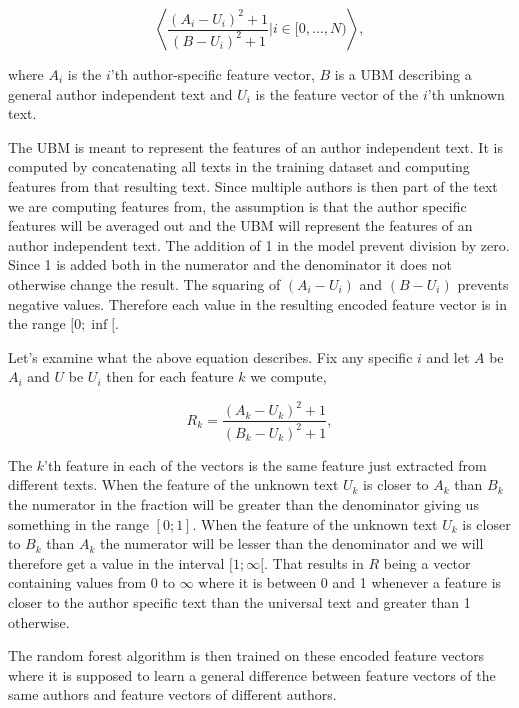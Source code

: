 \begin{equation}
    \left\langle
        \dfrac{(A_i-U_i)^2+1}{(B-U_i)^2+1}|i \in [0,\dots, N)
    \right\rangle,
\end{equation}

where $A_i$ is the $i$'th author-specific feature vector, $B$ is a \gls{UBM}
describing a general author independent text and $U_i$ is the feature vector of
the $i$'th unknown text.

The \gls{UBM} is meant to represent the features of an author independent text.
It is computed by concatenating all texts in the training dataset and computing
features from that resulting text. Since multiple authors is then part of the
text we are computing features from, the assumption is that the author specific
features will be averaged out and the \gls{UBM} will represent the features of
an author independent text. The addition of 1 in the model prevent division
by zero. Since 1 is added both in the numerator and the denominator it does
not otherwise change the result. The squaring of $(A_i - U_i)$ and $(B - U_i)$
prevents negative values. Therefore each value in the resulting encoded feature
vector is in the range $[0; \inf[$.

Let's examine what the above equation describes. Fix any specific $i$ and let
$A$ be $A_i$ and $U$ be $U_i$ then for each feature $k$ we compute,

\begin{equation}
    R_k = \frac{(A_k-U_k)^2+1}{(B_k-U_k)^2+1},
\end{equation}

The $k$'th feature in each of the vectors is the same feature just extracted
from different texts. When the feature of the unknown text $U_k$ is closer to
$A_k$ than $B_k$ the numerator in the fraction will be greater than the
denominator giving us something in the range $[0; 1]$. When the feature of the
unknown text $U_k$ is closer to $B_k$ than $A_k$ the numerator will be lesser
than the denominator and we will therefore get a value in the interval
$[1; \infty[$. That results in $R$ being a vector containing values from 0 to
$\infty$ where it is between 0 and 1 whenever a feature is closer to the author
specific text than the universal text and greater than 1 otherwise.

The random forest algorithm is then trained on these encoded feature vectors
where it is supposed to learn a general difference between feature vectors of
the same authors and feature vectors of different authors.

